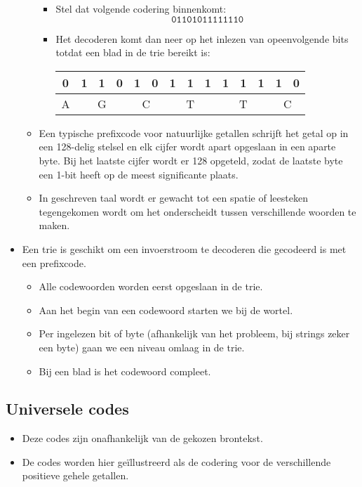 \begin{itemize}
\begin{itemize}
        \begin{itemize}
            \item Stel dat volgende codering binnenkomt:
            $$\texttt{01101011111110}$$
            \item Het decoderen komt dan neer op het inlezen van opeenvolgende bits totdat een blad in de trie bereikt is:
            \begin{table}[ht]
                \centering
                \begin{tabular}{c | c c c | c c|  c c c | c c c | c c }
                0 & 1 & 1 & 0 & 1 & 0 & 1 & 1 & 1 & 1 & 1 & 1 & 1 & 0 \\
                \hline
                A & \multicolumn{3}{c|}{G} & \multicolumn{2}{c|}{C} & \multicolumn{3}{c|}{T}  & \multicolumn{3}{c|}{T} & \multicolumn{2}{c}{C}  
                \end{tabular}
            \end{table}
        \end{itemize}
        \item Een typische prefixcode voor natuurlijke getallen schrijft het getal op in een 128-delig stelsel en elk cijfer wordt apart opgeslaan in een aparte byte. Bij het laatste cijfer wordt er 128 opgeteld, zodat de laatste byte een 1-bit heeft op de meest significante plaats.
        \item In geschreven taal wordt er gewacht tot een spatie of leesteken tegengekomen wordt om het onderscheidt tussen verschillende woorden te maken.
    \end{itemize}
    \item Een trie is geschikt om een invoerstroom te decoderen die gecodeerd is met een prefixcode.
    \begin{itemize}
        \item Alle codewoorden worden eerst opgeslaan in de trie.
        \item Aan het begin van een codewoord starten we bij de wortel.
        \item Per ingelezen bit of byte (afhankelijk van het probleem, bij strings zeker een byte) gaan we een niveau omlaag in de trie.
        \item Bij een blad is het codewoord compleet.
    \end{itemize}
\end{itemize}

\subsection{Universele codes}
\begin{itemize}
    \item Deze codes zijn onafhankelijk van de gekozen brontekst.
    \item De codes worden hier geïllustreerd als de codering voor de verschillende positieve gehele getallen.
\end{itemize}

